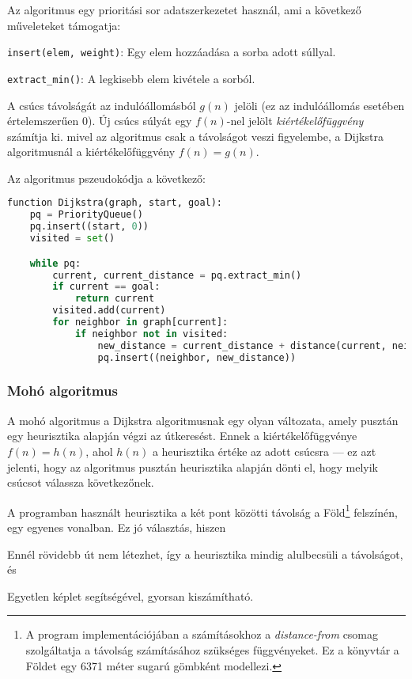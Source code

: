 Az algoritmus egy prioritási sor adatszerkezetet használ, ami a következő műveleteket támogatja:

\begin{compactitem}
    \item \texttt{insert(elem, weight)}: Egy elem hozzáadása a sorba adott súllyal.
    \item \texttt{extract\_min()}: A legkisebb elem kivétele a sorból.
\end{compactitem}

A csúcs távolságát az indulóállomásból $g(n)$ jelöli (ez az indulóállomás esetében értelemszerűen $0$). Új csúcs súlyát egy $f(n)$-nel jelölt \textit{kiértékelőfüggvény} számítja ki. mivel az algoritmus csak a távolságot veszi figyelembe, a Dijkstra algoritmusnál a kiértékelőfüggvény $f(n) = g(n)$.

Az algoritmus pszeudokódja a következő: \\

\begin{minipage}{\textwidth}
\begin{lstlisting}[language={Python}]
function Dijkstra(graph, start, goal):
    pq = PriorityQueue()
    pq.insert((start, 0))
    visited = set()

    while pq:
        current, current_distance = pq.extract_min()
        if current == goal:
            return current
        visited.add(current)
        for neighbor in graph[current]:
            if neighbor not in visited:
                new_distance = current_distance + distance(current, neighbor)
                pq.insert((neighbor, new_distance))
\end{lstlisting}
\end{minipage}

\subsubsection{Mohó algoritmus}

A mohó algoritmus a Dijkstra algoritmusnak egy olyan változata, amely pusztán egy heurisztika alapján végzi az útkeresést\cite{russell2020artificial}. Ennek a kiértékelőfüggvénye $f(n) = h(n)$, ahol $h(n)$ a heurisztika értéke az adott csúcsra --- ez azt jelenti, hogy az algoritmus pusztán heurisztika alapján dönti el, hogy melyik csúcsot válassza következőnek.

A programban használt heurisztika a két pont közötti távolság a Föld\footnote{A program implementációjában a számításokhoz a \textit{distance-from} csomag szolgáltatja a távolság számításához szükséges függvényeket. Ez a könyvtár a Földet egy 6371 méter sugarú gömbként modellezi\cite{distancefrom-github}.} felszínén, egy egyenes vonalban. Ez jó választás\cite{russell2020artificial}, hiszen
\begin{compactenum}
    \item Ennél rövidebb út nem létezhet, így a heurisztika mindig alulbecsüli a távolságot, és
    \item Egyetlen képlet segítségével, gyorsan kiszámítható.
\end{compactenum}

